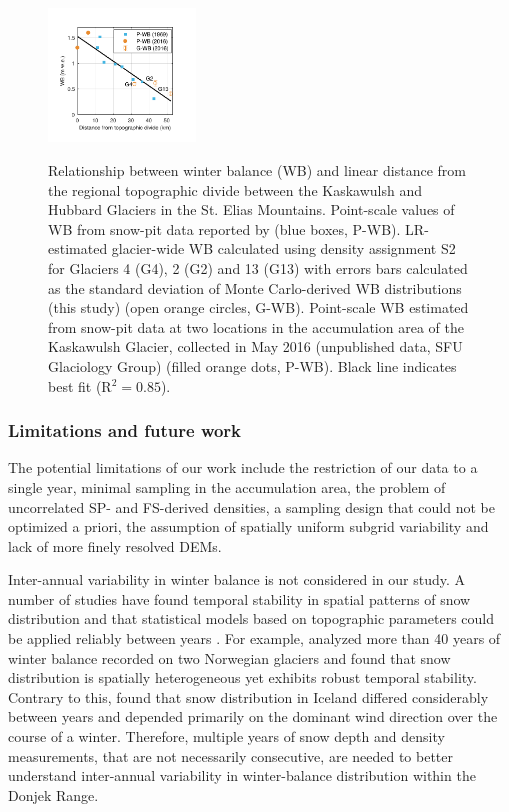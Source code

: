 \documentclass[twocolumn, letterpaper]{igs}
\begin{document}
\begin{figure}
	\centering
	\includegraphics[width =0.35\textwidth]{AccumGrad.pdf}\\
	\caption{Relationship between winter balance (WB) and linear distance from the regional topographic divide between the Kaskawulsh and Hubbard Glaciers in the St. Elias Mountains. Point-scale values of WB from snow-pit data reported by \cite{Taylor1969} (blue boxes, P-WB). LR-estimated glacier-wide WB calculated using density assignment S2 for Glaciers 4 (G4), 2 (G2) and 13 (G13) with errors bars calculated as the standard deviation of Monte Carlo-derived WB distributions (this study) (open orange circles, G-WB). Point-scale WB estimated from snow-pit data at two locations in the accumulation area of the Kaskawulsh Glacier, collected in May 2016 (unpublished data, SFU Glaciology Group) (filled orange dots, P-WB). Black line indicates best fit (R$^2=0.85$).}
	\label{fig:AccumGrad}
\end{figure}

\subsubsection{Limitations and future work}

The potential limitations of our work include the restriction of our data to a single year, minimal sampling in the accumulation area, the problem of uncorrelated SP- and FS-derived densities, a sampling design that could not be optimized a priori, the assumption of spatially uniform subgrid variability and lack of more finely resolved DEMs.

Inter-annual variability in winter balance is not considered in our study. A number of studies have found temporal stability in spatial patterns of snow distribution and that statistical models based on topographic parameters could be applied reliably between years \citep[e.g.][]{Grunewald2013}. For example, \cite{Walmsley2015} analyzed more than 40 years of winter balance recorded on two Norwegian glaciers and found that snow distribution is spatially heterogeneous yet exhibits robust temporal stability. Contrary to this, \cite{Crochet2007} found that snow distribution in Iceland differed considerably between years and depended primarily on the dominant wind direction over the course of a winter. Therefore, multiple years of snow depth and density measurements, that are not necessarily consecutive, are needed to better understand inter-annual variability in winter-balance distribution within the Donjek Range.
\end{document}
